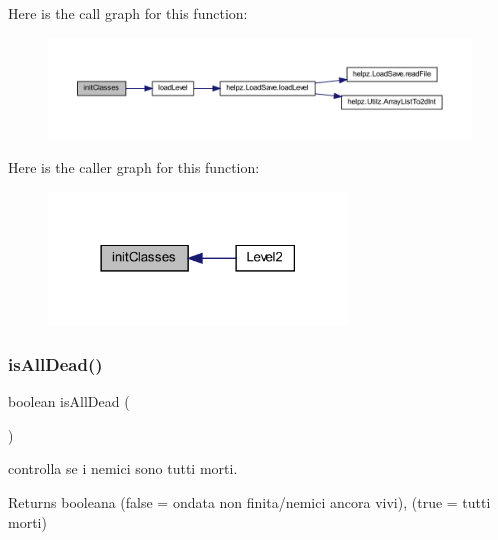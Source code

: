 Here is the call graph for this function\+:
\nopagebreak
\begin{figure}[H]
\begin{center}
\leavevmode
\includegraphics[width=350pt]{classscenes_1_1_level2_afe125d345675ffefe8da7e96d39773f3_cgraph}
\end{center}
\end{figure}
Here is the caller graph for this function\+:\nopagebreak
\begin{figure}[H]
\begin{center}
\leavevmode
\includegraphics[width=225pt]{classscenes_1_1_level2_afe125d345675ffefe8da7e96d39773f3_icgraph}
\end{center}
\end{figure}
\mbox{\label{classscenes_1_1_level2_acd1846d50c3d8678777f9ab6716f5cf3}} 
\subsubsection{\texorpdfstring{is\+All\+Dead()}{isAllDead()}}
{\footnotesize\ttfamily boolean is\+All\+Dead (\begin{DoxyParamCaption}{ }\end{DoxyParamCaption})\hspace{0.3cm}{\ttfamily [private]}}



controlla se i nemici sono tutti morti. 

\begin{DoxyReturn}{Returns}
booleana (false = ondata non finita/nemici ancora vivi), (true = tutti morti) 
\end{DoxyReturn}


